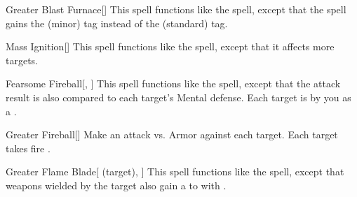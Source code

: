 \lowercase{\hypertarget{spell:Greater Blast Furnace}{}}\label{spell:Greater Blast Furnace}
\begin{freeability}[Rank 5]{\hypertarget{spell:Greater Blast Furnace}{Greater Blast Furnace}}[]
This spell functions like the  spell, except that the spell gains the  (minor) tag instead of the  (standard) tag.
\end{freeability}
\vspace{0.25em}



\lowercase{\hypertarget{spell:Mass Ignition}{}}\label{spell:Mass Ignition}
\begin{freeability}[Rank 5]{\hypertarget{spell:Mass Ignition}{Mass Ignition}}[]
This spell functions like the  spell, except that it affects more targets.
\end{freeability}
\vspace{0.25em}



\lowercase{\hypertarget{spell:Fearsome Fireball}{}}\label{spell:Fearsome Fireball}
\begin{freeability}[Rank 6]{\hypertarget{spell:Fearsome Fireball}{Fearsome Fireball}}[, ]
This spell functions like the  spell, except that the attack result is also compared to each target's Mental defense.
\hit Each target is  by you as a .
\end{freeability}
\vspace{0.25em}



\lowercase{\hypertarget{spell:Greater Fireball}{}}\label{spell:Greater Fireball}
\begin{freeability}[Rank 6]{\hypertarget{spell:Greater Fireball}{Greater Fireball}}[]
Make an attack vs. Armor against each target.
\hit Each target takes fire .
\end{freeability}
\vspace{0.25em}



\lowercase{\hypertarget{spell:Greater Flame Blade}{}}\label{spell:Greater Flame Blade}
\begin{attuneability}[Rank 6]{\hypertarget{spell:Greater Flame Blade}{Greater Flame Blade}}[ (target), ]
This spell functions like the  spell, except that weapons wielded by the target also gain a   to  with .
\end{attuneability}
\vspace{0.25em}



